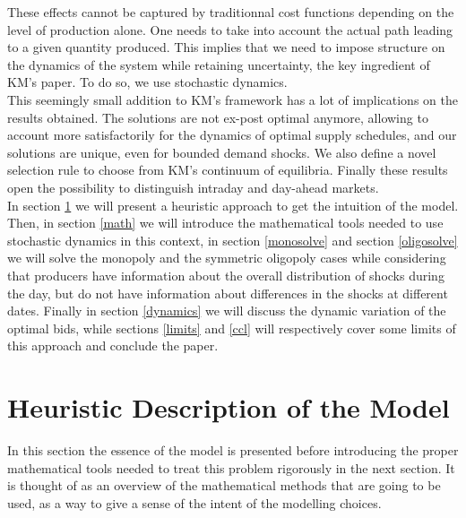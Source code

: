 These effects cannot be captured by traditionnal cost functions depending on the level of production alone. One needs to take into account the actual path leading to a given quantity produced. This implies that we need to impose structure on the dynamics of the system while retaining uncertainty, the key ingredient of KM's paper. To do so, we use stochastic dynamics. \\

This seemingly small addition to KM's framework has a lot of implications on the results obtained. The solutions are not ex-post optimal anymore, allowing to account more satisfactorily for the dynamics of optimal supply schedules, and our solutions are unique, even for bounded demand shocks. We also define a novel selection rule to choose from KM's continuum of equilibria. Finally these results open the possibility to distinguish intraday and day-ahead markets. \\ 

In section \ref{heur} we will present a heuristic approach to get the intuition of the model. Then, in section \ref{math} we will introduce the mathematical tools needed to use stochastic dynamics in this context, in section \ref{monosolve} and section \ref{oligosolve} we will solve the monopoly and the symmetric oligopoly cases while considering that producers have information about the overall distribution of shocks during the day, but do not have information about differences in the shocks at different dates. Finally in section \ref{dynamics} we will discuss the dynamic variation of the optimal bids, while sections \ref{limits} and \ref{ccl} will respectively cover some limits of this approach and conclude the paper.  

\section{Heuristic Description of the Model}\label{heur}
In this section the essence of the model is presented before introducing the proper mathematical tools needed to treat this problem rigorously in the next section. It is thought of as an overview of the mathematical methods that are going to be used, as a way to give a sense of the intent of the modelling choices.\\

